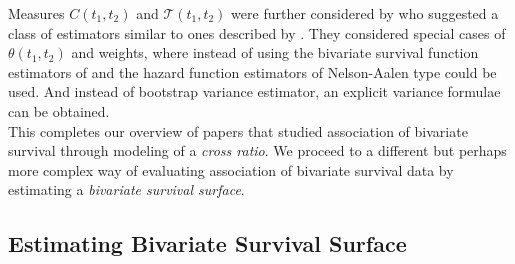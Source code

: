 \documentclass[]{article}
\begin{document}
Measures $C(t_1, t_2)$ and $\mathcal{T}(t_1, t_2)$ were further considered by
\cite{fan2000class} who suggested a class of estimators similar to ones described by \cite{fan2000dependence} . They considered special cases of $\theta(t_1, t_2)$ and weights, where instead of using the bivariate survival function estimators of \cite{dabrowska1988kaplan} and \cite{prentice1992covariance} the hazard function estimators of Nelson-Aalen type could be used. And instead of bootstrap variance estimator, an explicit variance formulae can be obtained.\\

This completes our overview of papers that studied association of bivariate survival through modeling of a \emph{cross ratio}. We proceed to a different but perhaps more complex way of evaluating association of bivariate survival data by estimating a \emph{bivariate survival surface}.

\subsection{Estimating Bivariate Survival Surface}
\end{document}

